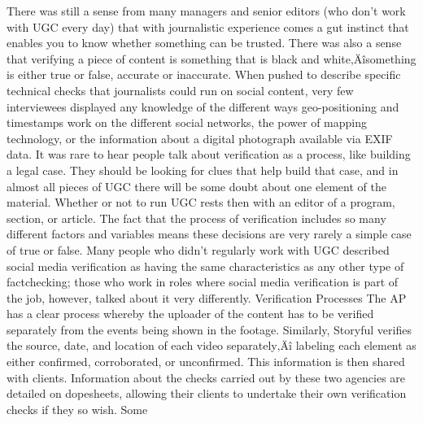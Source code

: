 \documentclass[symmetric, notoc, nobib]{towcenter-book}
\begin{document}
There was still a sense from many managers and senior editors (who don't
work with UGC every day) that with journalistic experience comes a gut
instinct that enables you to know whether something can be trusted. There
was also a sense that verifying a piece of content is something that is black
and white‚Äîsomething is either true or false, accurate or inaccurate.
When pushed to describe specific technical checks that journalists could
run on social content, very few interviewees displayed any knowledge of the
different ways geo-positioning and timestamps work on the different social
networks, the power of mapping technology, or the information about a
digital photograph available via EXIF data.
It was rare to hear people talk about verification as a process, like building
a legal case. They should be looking for clues that help build that case, and
in almost all pieces of UGC there will be some doubt about one element of
the material. Whether or not to run UGC rests then with an editor of a program,
section, or article. The fact that the process of verification includes so
many different factors and variables means these decisions are very rarely a
simple case of true or false.
Many people who didn't regularly work with UGC described social media
verification as having the same characteristics as any other type of factchecking;
those who work in roles where social media verification is part of
the job, however, talked about it very differently.
Verification Processes
The AP has a clear process whereby the uploader of the content has to be
verified separately from the events being shown in the footage. Similarly,
Storyful verifies the source, date, and location of each video separately‚Äî
labeling each element as either confirmed, corroborated, or unconfirmed.
This information is then shared with clients. Information about the checks
carried out by these two agencies are detailed on dopesheets, allowing their
clients to undertake their own verification checks if they so wish. Some
\end{document}
